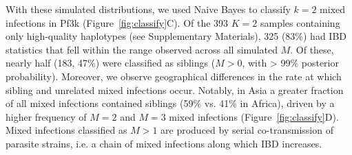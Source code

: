 \documentclass[9pt,lineno]{elife}
\begin{document}
With these simulated distributions, we used Naive Bayes to classify $k=2$ mixed infections in Pf3k (Figure~\ref{fig:classify}C).  Of the 393  $K = 2$ samples containing only high-quality haplotypes (see Supplementary Materials), 325 (83\%) had IBD statistics that fell within the range observed across all simulated $M$. Of these, nearly half (183, 47\%) were classified as siblings ($M > 0$, with > 99\% posterior probability).  Moreover, we observe geographical differences in the rate at which sibling and unrelated mixed infections occur. Notably, in Asia a greater fraction of all mixed infections contained siblings (59\% vs. 41\% in Africa), driven by a higher frequency of $M=2$ and $M=3$ mixed infections (Figure~\ref{fig:classify}D).  Mixed infections classified as $M>1$ are produced by serial co-transmission of  parasite strains, i.e. a chain of mixed infections along which IBD increases.
\end{document}
